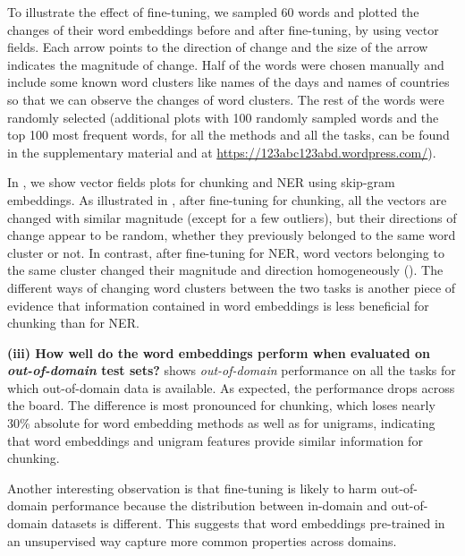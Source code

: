 To illustrate the effect of fine-tuning, we sampled 60 words and plotted the changes of their word embeddings before and after fine-tuning, by using vector fields. Each arrow points to the direction of change and the size of the arrow indicates the magnitude of change.  Half of the words were chosen manually and include some known word clusters like names of the days and names of countries so that we can observe the changes of word clusters.  The rest of the words were randomly selected (additional plots with 100 randomly sampled words and the top 100 most frequent words, for all the methods and all the tasks, can be found in the supplementary material and at \url{https://123abc123abd.wordpress.com/}).

In , we show vector fields plots for chunking and NER using skip-gram embeddings.
As illustrated in , after fine-tuning for chunking, all the vectors are changed with similar magnitude 
(except for a few outliers), but their directions of change appear to be random, 
whether they previously belonged to the same word cluster or not. 
In contrast, after fine-tuning for NER, word vectors belonging to the same cluster changed their magnitude and direction homogeneously (). 
The different ways of changing word clusters between the two tasks is another piece of evidence that information contained in word embeddings is less beneficial for chunking than for NER. 


\textbf{(iii) How well do the word embeddings perform when evaluated on \textit{out-of-domain} test sets?}
 shows \textit{out-of-domain} performance on all the tasks for which out-of-domain data is available.
As expected, the performance drops across the board. The difference is most pronounced for chunking, which loses nearly 30\% absolute for word embedding methods as well as for unigrams, 
indicating that word embeddings and unigram features provide similar information 
for chunking. 


Another interesting observation is that fine-tuning is likely to harm out-of-domain performance because the distribution between in-domain and out-of-domain datasets is different. This suggests that word embeddings pre-trained in an unsupervised way capture more common properties across domains. 

